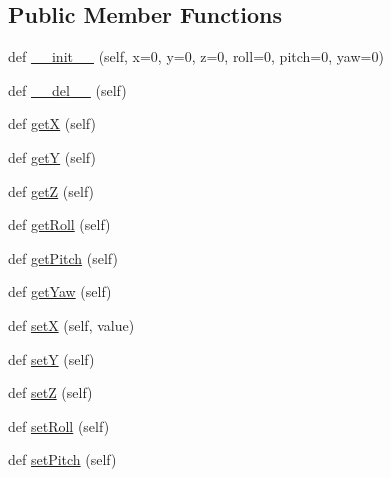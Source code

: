 \subsection*{Public Member Functions}
\begin{DoxyCompactItemize}
\item 
def \mbox{\hyperlink{classwindshape_1_1drone_1_1common_1_1_drone_pose_1_1_drone_pose_af7fb4cb02154cab7f75b35c1f9bbea92}{\+\_\+\+\_\+init\+\_\+\+\_\+}} (self, x=0, y=0, z=0, roll=0, pitch=0, yaw=0)
\item 
def \mbox{\hyperlink{classwindshape_1_1drone_1_1common_1_1_drone_pose_1_1_drone_pose_aac0c9e7a5d7c6f020001af9e03fe4f2a}{\+\_\+\+\_\+del\+\_\+\+\_\+}} (self)
\item 
def \mbox{\hyperlink{classwindshape_1_1drone_1_1common_1_1_drone_pose_1_1_drone_pose_a44ac4d925510245bcfd098f1680f0568}{getX}} (self)
\item 
def \mbox{\hyperlink{classwindshape_1_1drone_1_1common_1_1_drone_pose_1_1_drone_pose_a47073071f86fdffd0bb138427674353d}{getY}} (self)
\item 
def \mbox{\hyperlink{classwindshape_1_1drone_1_1common_1_1_drone_pose_1_1_drone_pose_a75fbfa37fed092c2a9b6c4a11fd838b3}{getZ}} (self)
\item 
def \mbox{\hyperlink{classwindshape_1_1drone_1_1common_1_1_drone_pose_1_1_drone_pose_acb51356e83d76f4e2decdd4b5e3a2bdc}{get\+Roll}} (self)
\item 
def \mbox{\hyperlink{classwindshape_1_1drone_1_1common_1_1_drone_pose_1_1_drone_pose_ad851aff1d4f079afc4df86d69d478f78}{get\+Pitch}} (self)
\item 
def \mbox{\hyperlink{classwindshape_1_1drone_1_1common_1_1_drone_pose_1_1_drone_pose_a2faeda598072bb0e159cc621ce0af17c}{get\+Yaw}} (self)
\item 
def \mbox{\hyperlink{classwindshape_1_1drone_1_1common_1_1_drone_pose_1_1_drone_pose_a5eda325676ba6d04b5549aa96babb93f}{setX}} (self, value)
\item 
def \mbox{\hyperlink{classwindshape_1_1drone_1_1common_1_1_drone_pose_1_1_drone_pose_a1f172ed7be6a7982ca92a379d798e242}{setY}} (self)
\item 
def \mbox{\hyperlink{classwindshape_1_1drone_1_1common_1_1_drone_pose_1_1_drone_pose_ab214530da7537bd8790697a2b670939a}{setZ}} (self)
\item 
def \mbox{\hyperlink{classwindshape_1_1drone_1_1common_1_1_drone_pose_1_1_drone_pose_a4a5e1cffd329d7bd84dc015233cd116e}{set\+Roll}} (self)
\item 
def \mbox{\hyperlink{classwindshape_1_1drone_1_1common_1_1_drone_pose_1_1_drone_pose_abceff0e6477ae0c8c20abc3f123f741b}{set\+Pitch}} (self)

\end{DoxyCompactItemize}
